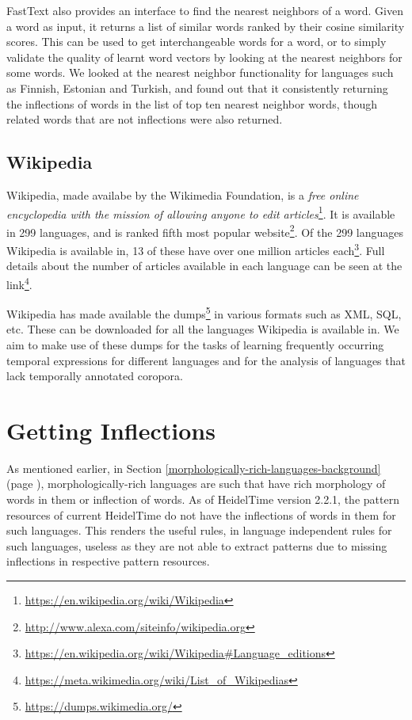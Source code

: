 FastText also provides an interface to find the nearest neighbors of a word. Given a word as input, it returns a list of similar words ranked by their cosine similarity scores. This can be used to get interchangeable words for a word, or to simply validate the quality of learnt word vectors by looking at the nearest neighbors for some words. We looked at the nearest neighbor functionality for languages such as Finnish, Estonian and Turkish, and found out that it consistently returning the inflections of words in the list of top ten nearest neighbor words, though related words that are not inflections were also returned.

\subsection{Wikipedia}
Wikipedia, made availabe by the Wikimedia Foundation, is a \textit{free online encyclopedia with the mission of allowing anyone to edit articles}\footnote{\url{https://en.wikipedia.org/wiki/Wikipedia}}. It is available in 299 languages, and is ranked fifth most popular website\footnote{\url{http://www.alexa.com/siteinfo/wikipedia.org}}. Of the 299 languages Wikipedia is available in, 13 of these have over one million articles each\footnote{\url{https://en.wikipedia.org/wiki/Wikipedia\#Language\_editions}}. Full details about the number of articles available in each language can be seen at the link\footnote{\url{https://meta.wikimedia.org/wiki/List\_of\_Wikipedias}}.

Wikipedia has made available the dumps\footnote{\url{https://dumps.wikimedia.org/}} in various formats such as XML, SQL, etc. These can be downloaded for all the languages Wikipedia is available in. We aim to make use of these dumps for the tasks of learning frequently occurring temporal expressions for different languages and for the analysis of languages that lack temporally annotated coropora. 
\section{Getting Inflections} \label{sec4b}
As mentioned earlier, in Section \ref{morphologically-rich-languages-background} (page \pageref{morphologically-rich-languages-background}), morphologically-rich languages are such that have rich morphology of words in them or inflection of words. As of HeidelTime version 2.2.1, the pattern resources of current HeidelTime do not have the inflections of words in them for such languages. This renders the useful rules, in language independent rules for such languages, useless as they are not able to extract patterns due to missing inflections in respective pattern resources.  

